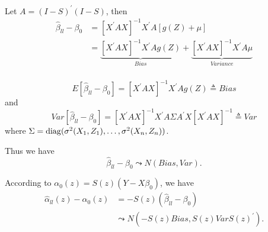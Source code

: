 \begin{solution}
    Let $A= (I-S)^\prime (I-S)$, then
    \begin{equation*}
        \begin{split}
            \hat{\beta}_{l l} - \beta_0  
            & = \left[ X^\prime A X \right]^{-1} X^\prime A \left[g(Z) + \mu\right] \\
            & = \underbrace{\left[ X^\prime A X \right]^{-1} X^\prime A g(Z)}_{Bias} +  \underbrace{\left[ X^\prime A X \right]^{-1} X^\prime A \mu}_{Variance} \\
        \end{split}
    \end{equation*}

    \begin{equation*}
        E \left[\hat{\beta}_{l l} - \beta_0  \right] = \left[ X^\prime A X \right]^{-1} X^\prime A g(Z) \triangleq Bias
    \end{equation*}
    and
    \begin{equation*}
        Var \left[\hat{\beta}_{l l} - \beta_0  \right] = \left[ X^\prime A X \right]^{-1} X^\prime A \Sigma A^\prime X \left[ X^\prime A  X \right]^{-1} \triangleq Var
    \end{equation*}
    where $\Sigma = \mathrm{diag}(\sigma^2(X_1, Z_1), \dots, \sigma^2(X_n, Z_n))$.

    Thus we have
    \begin{equation*}
        \hat{\beta}_{l l} - \beta_0  \leadsto N\left( Bias, Var \right).
    \end{equation*}
    
    According to $\alpha_{0}(z)=S(z)\left(Y-X \beta_{0}\right)$, we have
    \begin{equation*}
        \begin{split}
            \hat{\alpha}_{l l} (z) - \alpha_{0}(z) 
            & = - S(z)(\hat{\beta}_{ll} -\beta_0) \\
            & \leadsto N \left( -S(z) Bias, S(z) Var S(z)^\prime \right).
        \end{split}
    \end{equation*}
\end{solution}